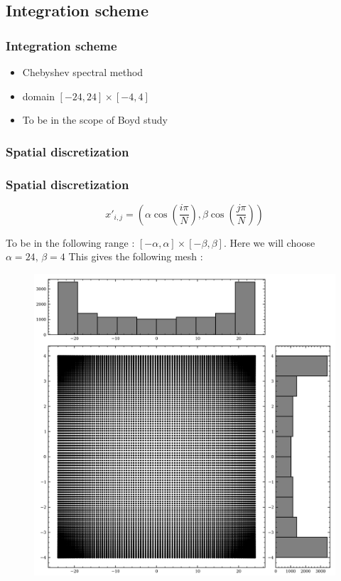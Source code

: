 \documentclass[numbering=fraction]{beamer}
\begin{document}
\subsection{Integration scheme}
\begin{frame}
    \frametitle{Integration scheme}
    \begin{itemize}
        \item Chebyshev spectral method
        \item domain $[-24, 24] \times [-4, 4]$
        \item To be in the scope of Boyd study
    \end{itemize}
\end{frame}
\subsubsection{Spatial discretization}
\begin{frame}

    \frametitle{Spatial discretization}
    $$x'_{i,j} = (\alpha \cos(\frac{i\pi}{N}), \beta \cos(\frac{j\pi}{N}))$$

    \begin{minipage}{.48\linewidth}
        To be in the following range : $[-\alpha, \alpha] \times [-\beta, \beta]$. Here we will choose $\alpha = 24, \, \beta = 4$
        This gives the following mesh :
    \end{minipage}
    \begin{minipage}{.5\linewidth}
        \begin{figure}[H]
            \includegraphics[width=1\linewidth]{./figure/mesh.png}

        \end{figure}
    \end{minipage}
\end{frame}
\end{document}
